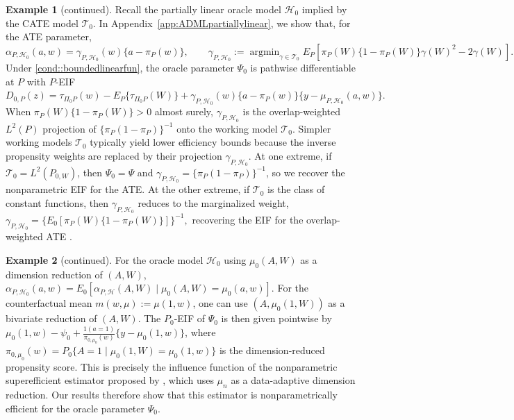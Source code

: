 \documentclass[11pt]{article}
\DeclareMathOperator*{\argmin}{argmin}
\theoremstyle{definition}
\newtheorem{example}{Example}
\begin{document}
\setcounter{example}{1}
\begin{example}[continued]
Recall the partially linear oracle model \(\mathcal{H}_0\) implied by the CATE model \(\mathcal{T}_0\). In Appendix~\ref{app:ADMLpartiallylinear}, we show that, for the ATE parameter,
\[
\alpha_{P,\mathcal{H}_0}(a,w)=\gamma_{P,\mathcal{H}_0}(w)\{a-\pi_P(w)\}, \qquad
\gamma_{P,\mathcal{H}_0}:=\argmin_{\gamma \in \mathcal{T}_0} E_P\!\left[\pi_P(W)\{1-\pi_P(W)\}\gamma(W)^2-2\gamma(W)\right].
\]
Under \ref{cond::boundedlinearfun}, the oracle parameter \(\Psi_0\) is pathwise differentiable at \(P\) with \(P\)-EIF $D_{0,P}(z)=\tau_{\Pi_0 P}(w)-E_P\{\tau_{\Pi_0 P}(W)\}
+\gamma_{P,\mathcal{H}_0}(w)\{a-\pi_P(w)\}\{y-\mu_{P,\mathcal{H}_0}(a,w)\}.$
When \(\pi_P(W)\{1-\pi_P(W)\}>0\) almost surely, \(\gamma_{P,\mathcal{H}_0}\) is the overlap-weighted \(L^2(P)\) projection of \(\{\pi_P(1-\pi_P)\}^{-1}\) onto the working model \(\mathcal{T}_0\). Simpler working models \(\mathcal{T}_0\) typically yield lower efficiency bounds because the inverse propensity weights are replaced by their projection \(\gamma_{P,\mathcal{H}_0}\). At one extreme, if \(\mathcal{T}_0=L^2(P_{0,W})\), then \(\Psi_0=\Psi\) and \(\gamma_{P,\mathcal{H}_0}=\{\pi_P(1-\pi_P)\}^{-1}\), so we recover the nonparametric EIF for the ATE. At the other extreme, if \(\mathcal{T}_0\) is the class of constant functions, then \(\gamma_{P,\mathcal{H}_0}\) reduces to the marginalized weight, $\gamma_{P,\mathcal{H}_0}=\{E_0[\pi_P(W)\{1-\pi_P(W)\}]\}^{-1},$ recovering the EIF for the overlap-weighted ATE \citep{imbensOverlapEstimand2006, li2019overlapWeights}.
\end{example}

\begin{example}[continued]
For the oracle model \(\mathcal{H}_0\) using \(\mu_0(A,W)\) as a dimension reduction of \((A,W)\), \(\alpha_{P,\mathcal{H}_0}(a,w) = E_0[\alpha_{P,\mathcal{H}}(A,W) \mid \mu_0(A,W) = \mu_0(a,w)]\). For the counterfactual mean \(m(w,\mu) := \mu(1,w)\), one can use \((A,\mu_0(1,W))\) as a bivariate reduction of \((A,W)\). The \(P_0\)-EIF of \(\Psi_0\) is then given pointwise by \(\mu_0(1,w) - \psi_0 +\frac{1(a=1)}{\pi_{0,\mu_0}(w)}\{y-\mu_0(1,w)\}\), where \(\pi_{0,\mu_0}(w)=P_0\{A=1 \mid \mu_0(1,W)=\mu_0(1,w)\}\) is the dimension-reduced propensity score. This is precisely the influence function of the nonparametric superefficient estimator proposed by \cite{ATEsupereff}, which uses \(\mu_n\) as a data-adaptive dimension reduction. Our results therefore show that this estimator is nonparametrically efficient for the oracle parameter \(\Psi_0\).
\end{example}
\end{document}
